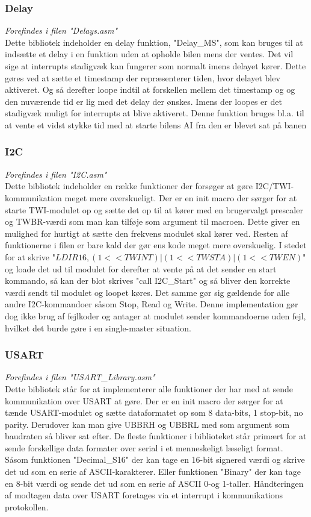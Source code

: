\subsubsection{Delay}
\textit{Forefindes i filen "Delays.asm"}\\
Dette bibliotek indeholder en delay funktion, "Delay\_MS", som kan bruges til at indsætte et delay i en funktion uden at opholde bilen mens der ventes. Det vil sige at interrupts stadigvæk kan fungerer som normalt imens delayet kører. Dette gøres ved at sætte et timestamp der repræsenterer tiden, hvor delayet blev aktiveret. Og så derefter loope indtil at forskellen mellem det timestamp og og den nuværende tid er lig med det delay der ønskes. Imens der loopes er det stadigvæk muligt for interrupts at blive aktiveret. Denne funktion bruges bl.a. til at vente et vidst stykke tid med at starte bilens AI fra den er blevet sat på banen

\subsubsection{I2C}
\textit{Forefindes i filen "I2C.asm"}\\
Dette bibliotek indeholder en række funktioner der forsøger at gøre I2C/TWI- kommunikation meget mere overskueligt. Der er en init macro der sørger for at starte TWI-modulet op og sætte det op til at kører med en brugervalgt prescaler og TWBR-værdi som man kan tilføje som argument til macroen. Dette giver en mulighed for hurtigt at sætte den frekvens modulet skal kører ved. Resten af funktionerne i filen er bare kald der gør ens kode meget mere overskuelig. I stedet for at skrive "$LDI R16,(1<<TWINT)|(1<<TWSTA)|(1<<TWEN)$" og loade det ud til modulet for derefter at vente på at det sender en start kommando, så kan der blot skrives "call I2C\_Start" og så bliver den korrekte værdi sendt til modulet og loopet køres. Det samme gør sig gældende for alle andre I2C-kommandoer såsom Stop, Read og Write. Denne implementation gør dog ikke brug af fejlkoder og antager at modulet sender kommandoerne uden fejl, hvilket det burde gøre i en single-master situation.

\subsubsection{USART}
\textit{Forefindes i filen "USART\_Library.asm"}\\
Dette bibliotek står for at implementerer alle funktioner der har med at sende kommunikation over USART at gøre. Der er en init macro der sørger for at tænde USART-modulet og sætte dataformatet op som 8 data-bits, 1 stop-bit, no parity. Derudover kan man give UBBRH og UBBRL med som argument som baudraten så bliver sat efter. De fleste funktioner i biblioteket står primært for at sende forskellige data formater over serial i et menneskeligt læseligt format. Såsom funktionen "Decimal\_S16" der kan tage en 16-bit signered værdi og skrive det ud som en serie af ASCII-karakterer. Eller funktionen "Binary" der kan tage en 8-bit værdi og sende det ud som en serie af ASCII 0-og 1-taller. Håndteringen af modtagen data over USART foretages via et interrupt i kommunikations protokollen.

